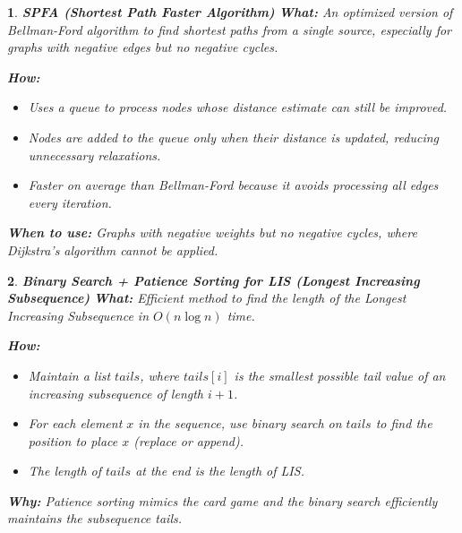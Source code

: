 \documentclass[%
addpoints]{exam}
\theoremstyle{problem}
\newtheorem{p}{}
\begin{document}
\begin{p}
\textbf{SPFA (Shortest Path Faster Algorithm)}
\textbf{What:}
An optimized version of Bellman-Ford algorithm to find shortest paths from a single source, especially for graphs with negative edges but no negative cycles.

\textbf{How:}
\begin{itemize}
\item Uses a queue to process nodes whose distance estimate can still be improved.
\item Nodes are added to the queue only when their distance is updated, reducing unnecessary relaxations.
\item Faster on average than Bellman-Ford because it avoids processing all edges every iteration.
\end{itemize}

\textbf{When to use:} Graphs with negative weights but no negative cycles, where Dijkstra's algorithm cannot be applied.
\hfill \end{p}

\begin{p}
\textbf{Binary Search + Patience Sorting for LIS (Longest Increasing Subsequence)}
\textbf{What:}
Efficient method to find the length of the Longest Increasing Subsequence in $O(n \log n)$ time.

\textbf{How:}
\begin{itemize}
\item Maintain a list $tails$, where $tails[i]$ is the smallest possible tail value of an increasing subsequence of length $i+1$.
\item For each element $x$ in the sequence, use binary search on $tails$ to find the position to place $x$ (replace or append).
\item The length of $tails$ at the end is the length of LIS.
\end{itemize}

\textbf{Why:} Patience sorting mimics the card game and the binary search efficiently maintains the subsequence tails.
\hfill \end{p}
\end{document}
